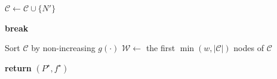 \begin{algorithm}
\begin{algorithmic}[1]
                \State $\mathcal{C} \gets \mathcal{C} \cup \{N'\}$

            \EndFor

        \EndFor

         
            \State \textbf{break}
        \EndIf

        \State Sort $\mathcal{C}$ by non-increasing $g(\cdot)$
        \State $\mathcal{W} \gets$ the first $\min(w, |\mathcal{C}|)$ nodes of $\mathcal{C}$

    \EndWhile

    \State \textbf{return} $(P^\star, f^\star)$

\EndProcedure
\end{algorithmic}
\end{algorithm}



